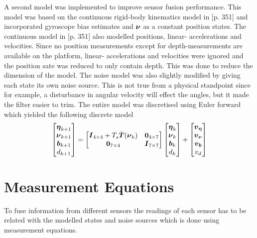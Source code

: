 A second model was implemented to improve sensor fusion performance. This model was based on the continuous rigid-body kinematics model in \citet{sensorfusion}[p. 351] and incorporated gyroscope bias estimates and $\boldsymbol{\nu}$ as a constant position states. The continuous model in \citet{sensorfusion}[p. 351] also modelled positions, linear- accelerations and velocities. Since no position measurements except for depth-measurements are available on the \abbrROV platform, linear- accelerations and velocities were ignored and the position sate was reduced to only contain depth. This was done to reduce the dimension of the model. The noise model was also slightly modified by giving each state its own noise source. This is not true from a physical standpoint since for example, a disturbance in angular velocity will effect the angles, but it made the filter easier to trim. The entire model was discretised using Euler forward which yielded the following discrete model
\begin{equation}\label{eq:expanded_model}
\begin{bmatrix}
\boldsymbol{\eta}_{k+1}\\
\boldsymbol{\nu}_{k+1}\\
\boldsymbol{b}_{k+1}\\
d_{k+1}
\end{bmatrix}=
\begin{bmatrix}
\boldsymbol{I}_{4\times4} + T_s \bar{\boldsymbol{T}}(\boldsymbol{\nu}_{k})& \boldsymbol{0}_{4\times7}\\
\boldsymbol{0}_{7\times4} & \boldsymbol{I}_{7\times7}\\
\end{bmatrix}
\begin{bmatrix}
\boldsymbol{\eta}_{k}\\
\boldsymbol{\nu}_{k}\\
\boldsymbol{b}_{k}\\
d_{k}
\end{bmatrix}
+\begin{bmatrix}
  \boldsymbol{v}_{\boldsymbol{\eta}}\\
  \boldsymbol{v}_{\boldsymbol{\nu}}\\
  \boldsymbol{v}_{\boldsymbol{b}}\\
  v_d 
\end{bmatrix}
\end{equation}

\section{Measurement Equations}
To fuse information from different sensors the readings of each sensor has to be related with the modelled states and noise sources which is done using measurement equations.

